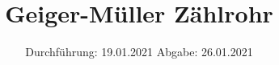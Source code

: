 

\subject{V703}
\title{Geiger-Müller Zählrohr}
\date{%
  Durchführung: 19.01.2021
  \hspace{3em}
  Abgabe: 26.01.2021
}



\maketitle
\thispagestyle{empty}
\tableofcontents
\newpage





\nocite{*}
\printbibliography{}


